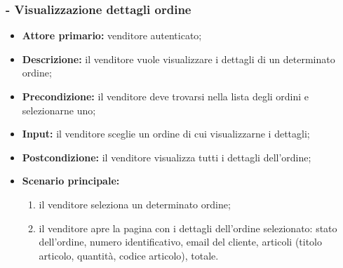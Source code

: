 \stepsubUserCase
\subsubsection{- Visualizzazione dettagli ordine}
\begin{itemize}
    \item \textbf{Attore primario:} venditore autenticato;
    \item \textbf{Descrizione:} il venditore vuole visualizzare i dettagli di un determinato ordine;
    \item \textbf{Precondizione:} il venditore deve trovarsi nella lista degli ordini e selezionarne uno;
    \item \textbf{Input:} il venditore sceglie un ordine di cui visualizzarne i dettagli;
    \item \textbf{Postcondizione:} il venditore visualizza tutti i dettagli dell'ordine;
    \item \textbf{Scenario principale:}
          \begin{enumerate}
              \item il venditore seleziona un determinato ordine;
              \item il venditore apre la pagina con i dettagli dell'ordine selezionato: stato dell'ordine, numero identificativo, email del cliente, articoli (titolo articolo, quantità, codice articolo), totale.
          \end{enumerate}
\end{itemize}

\stepsubUserCase
